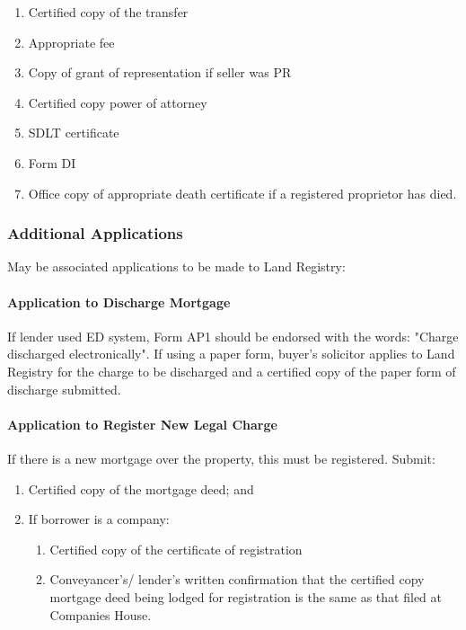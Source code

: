 \documentclass[
]{article}
\providecommand{\tightlist}{%
  \setlength{\itemsep}{0pt}\setlength{\parskip}{0pt}}
\begin{document}
\begin{enumerate}
\tightlist
\item
  Certified copy of the transfer
\item
  Appropriate fee
\item
  Copy of grant of representation if seller was PR
\item
  Certified copy power of attorney
\item
  SDLT certificate
\item
  Form DI
\item
  Office copy of appropriate death certificate if a registered
  proprietor has died.
\end{enumerate}

\hypertarget{additional-applications}{%
\subsubsection{Additional Applications}\label{additional-applications}}

May be associated applications to be made to Land Registry:

\hypertarget{application-to-discharge-mortgage}{%
\paragraph{Application to Discharge
Mortgage}\label{application-to-discharge-mortgage}}

If lender used ED system, Form AP1 should be endorsed with the words:
"Charge discharged electronically". If using a paper form, buyer's
solicitor applies to Land Registry for the charge to be discharged and a
certified copy of the paper form of discharge submitted.

\hypertarget{application-to-register-new-legal-charge}{%
\paragraph{Application to Register New Legal
Charge}\label{application-to-register-new-legal-charge}}

If there is a new mortgage over the property, this must be registered.
Submit:

\begin{enumerate}
\tightlist
\item
  Certified copy of the mortgage deed; and
\item
  If borrower is a company:

  \begin{enumerate}
  \tightlist
  \item
    Certified copy of the certificate of registration
  \item
    Conveyancer's/ lender's written confirmation that the certified copy
    mortgage deed being lodged for registration is the same as that
    filed at Companies House.
  \end{enumerate}
\end{enumerate}
\end{document}
